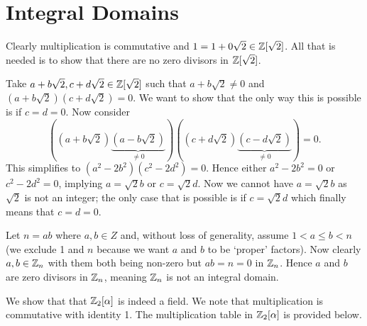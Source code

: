 \section{Integral Domains}
\begin{questions}
    \item Clearly multiplication is commutative and $1 = 1 + 0\sqrt2 \in \mathbb{Z}[\sqrt2]$. All that is needed is to show that there are no zero divisors in $\mathbb{Z}[\sqrt2]$.

    Take $a+b\sqrt2, c+d\sqrt2 \in \mathbb{Z}[\sqrt2]$ such that $a+b\sqrt2 \neq 0$ and $(a+b\sqrt2)(c+d\sqrt2) = 0$. We want to show that the only way this is possible is if $c = d = 0$. Now consider
    \[
        \left((a+b\sqrt2)\underbrace{(a-b\sqrt2)}_{\neq 0}\right)\left((c+d\sqrt2)\underbrace{(c-d\sqrt2)}_{\neq 0}\right) = 0.
    \]
    This simplifies to $(a^2-2b^2)(c^2-2d^2) = 0$. Hence either $a^2-2b^2 = 0$ or $c^2-2d^2 = 0$, implying $a = \sqrt2b$ or $c = \sqrt2d$. Now we cannot have $a = \sqrt2b$ as $\sqrt2$ is not an integer; the only case that is possible is if $c = \sqrt2d$ which finally means that $c = d = 0$.

    \item Let $n = ab$ where $a,b \in Z$ and, without loss of generality, assume $1 < a \leq b < n$ (we exclude 1 and $n$ because we want $a$ and $b$ to be `proper' factors). Now clearly $a, b \in \mathbb{Z}_n$ with them both being non-zero but $ab = n = 0$ in $\mathbb{Z}_n$. Hence $a$ and $b$ are zero divisors in $\mathbb{Z}_n$, meaning $\mathbb{Z}_n$ is not an integral domain.

    \item We show that that $\mathbb{Z}_2[\alpha]$ is indeed a field. We note that multiplication is commutative with identity 1. The multiplication table in $\mathbb{Z}_2[\alpha]$ is provided below.
    \begin{table}[H]
        \centering
    \end{table}


\end{questions}
